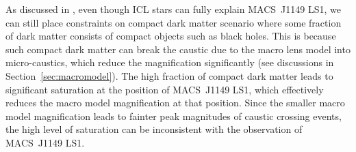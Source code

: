 \documentclass[showpacs,twocolumn,preprintnumbers,amsmath,amssymb,superscriptaddress,nofootinbib]{revtex4}
\begin{document}
As discussed in \cite{Kelly:2017fps,Diego:2017drh,Venumadhav:2017pps},
even though ICL stars can fully explain MACS~J1149 LS1, we can still
place constraints on compact dark matter scenario where some fraction
of dark matter consists of compact objects such as black holes. 
This is because such compact dark matter can break the caustic due to
the macro lens model into micro-caustics, which reduce the
magnification significantly (see discussions in
Section~\ref{sec:macromodel}). The high fraction of compact dark
matter leads to significant saturation at the position of MACS~J1149
LS1, which effectively reduces the macro model magnification at that
position. Since the smaller macro model magnification leads to fainter
peak magnitudes of caustic crossing events, the high level of
saturation can be inconsistent with the observation of MACS~J1149 LS1.
\end{document}
